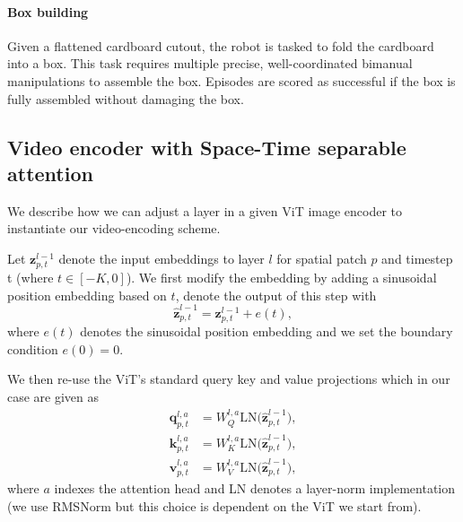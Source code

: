 \paragraph{Box building} Given a flattened cardboard cutout, the robot is tasked to fold the cardboard into a box. This task requires multiple precise, well-coordinated bimanual manipulations to assemble the box. Episodes are scored as successful if the box is fully assembled without damaging the box.







\subsection{Video encoder with Space-Time separable attention}
\label{appendix:st_attention}
We describe how we can adjust a layer in a given ViT image encoder to instantiate our video-encoding scheme.

Let $\mathbf{z}^{l-1}_{p, t}$ denote the input embeddings to layer $l$ for spatial patch $p$ and timestep t (where $t \in [-K, 0]$). We first modify the embedding by adding a sinusoidal position embedding based on $t$, denote the output of this step with 
$$
\hat{\mathbf{z}}^{l-1}_{p, t} = \mathbf{z}^{l-1}_{p, t} + e(t),
$$
where $e(t)$ denotes the sinusoidal position embedding and we set the boundary condition $e(0) = 0$.

We then re-use the ViT's standard query key and value projections which in our case are given as
\begin{equation}
    \begin{aligned}
        \mathbf{q}^{l, a}_{p, t} &= W^{l, a}_Q \text{LN}\big( \hat{\mathbf{z}}^{l-1}_{p, t} \big), \\
        \mathbf{k}^{l, a}_{p, t} &= W^{l, a}_K \text{LN}\big( \hat{\mathbf{z}}^{l-1}_{p, t} \big), \\
        \mathbf{v}^{l, a}_{p, t} &= W^{l, a}_V \text{LN}\big( \hat{\mathbf{z}}^{l-1}_{p, t} \big),
    \end{aligned}
\end{equation}
where $a$ indexes the attention head and LN denotes a layer-norm implementation (we use RMSNorm but this choice is dependent on the ViT we start from).

